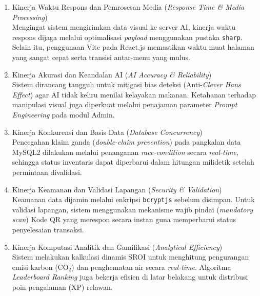\begin{enumerate}
    \item Kinerja Waktu Respons dan Pemrosesan Media (\textit{Response Time \& Media Processing}) \\
    Mengingat sistem mengirimkan data visual ke server AI, kinerja waktu respons dijaga melalui optimalisasi \textit{payload} menggunakan pustaka \texttt{sharp}. Selain itu, penggunaan Vite pada React.js memastikan waktu muat halaman yang sangat cepat serta transisi antar-menu yang mulus.
    
    \item Kinerja Akurasi dan Keandalan AI (\textit{AI Accuracy \& Reliability}) \\
    Sistem dirancang tangguh untuk mitigasi bias deteksi (Anti-\textit{Clever Hans Effect}) agar AI tidak keliru menilai kelayakan makanan. Ketahanan terhadap manipulasi visual juga diperkuat melalui penajaman parameter \textit{Prompt Engineering} pada modul Admin.
    
    \item Kinerja Konkurensi dan Basis Data (\textit{Database Concurrency}) \\
    Pencegahan klaim ganda (\textit{double-claim prevention}) pada pangkalan data MySQL2 dilakukan melalui penanganan \textit{race-condition} secara \textit{real-time}, sehingga status inventaris dapat diperbarui dalam hitungan milidetik setelah permintaan divalidasi.
    
    \item Kinerja Keamanan dan Validasi Lapangan (\textit{Security \& Validation}) \\
    Keamanan data dijamin melalui enkripsi \texttt{bcryptjs} sebelum disimpan. Untuk validasi lapangan, sistem menggunakan mekanisme wajib pindai (\textit{mandatory scan}) Kode QR yang merespon secara instan guna memperbarui status penyelesaian transaksi.
    
    \item Kinerja Komputasi Analitik dan Gamifikasi (\textit{Analytical Efficiency}) \\
    Sistem melakukan kalkulasi dinamis SROI untuk menghitung pengurangan emisi karbon (CO$_2$) dan penghematan air secara \textit{real-time}. Algoritma \textit{Leaderboard Ranking} juga bekerja efisien di latar belakang untuk distribusi poin pengalaman (XP) relawan.
\end{enumerate}